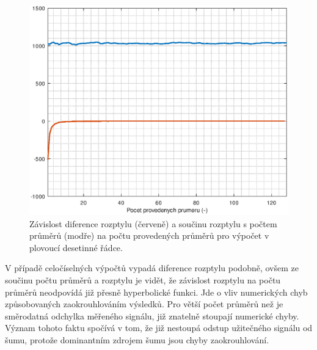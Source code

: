 \begin{figure}[htbp]
\includegraphics[width=\textwidth,keepaspectratio]{images/averaging_float_difference_error.eps}\caption{Závislost diference rozptylu (červeně) a součinu rozptylu s počtem průměrů (modře) na počtu provedených průměrů pro výpočet v plovoucí desetinné řádce.}\label{averaging_float_difference_error}
\end{figure}

V případě celočíselných výpočtů vypadá diference rozptylu podobně, ovšem ze součinu počtu průměrů a rozptylu je vidět, že závislost rozptylu na počtu průměrů neodpovídá již přesně hyperbolické funkci. Jde o vliv numerických chyb způsobovaných zaokrouhlováním výsledků. Pro větší počet průměrů než je směrodatná odchylka měřeného signálu, již znatelně stoupají numerické chyby. Význam tohoto faktu spočívá v tom, že již nestoupá odstup užitečného signálu od šumu, protože dominantním zdrojem šumu jsou chyby zaokrouhlování.

